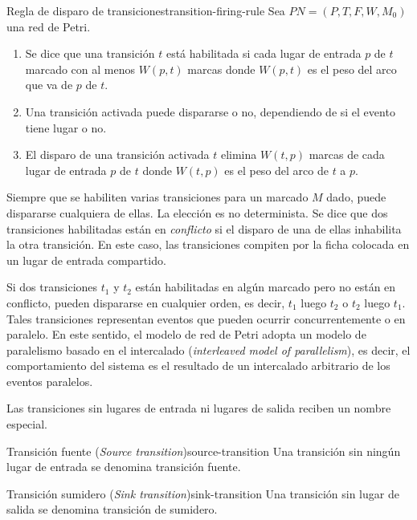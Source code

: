 \begin{definition}{Regla de disparo de transiciones}{transition-firing-rule}
      Sea $ PN = (P, T, F, W, M_{0}) $ una red de Petri.
      \begin{enumerate}[label=(\roman*)]
            \item Se dice que una transición $t$ está habilitada si cada lugar de entrada $p$ de $t$
                  marcado con al menos $W(p, t)$ marcas
                  donde $W(p,t)$ es el peso del arco que va de $p$ de $t$.
            \item Una transición activada puede dispararse o no, dependiendo de si el evento tiene
                  lugar o no.
            \item El disparo de una transición activada $t$ elimina
                  $W(t,p)$ marcas de cada lugar de entrada $p$ de $t$
                  donde $W(t, p)$ es el peso del arco de $t$ a $p$.
      \end{enumerate}
\end{definition}

Siempre que se habiliten varias transiciones para un marcado $M$ dado, puede dispararse
cualquiera de ellas. La elección es no determinista. Se dice que dos transiciones habilitadas
están en \emph{conflicto} si el disparo de una de ellas inhabilita la otra transición.
En este caso, las transiciones compiten por la ficha colocada en un lugar de entrada compartido.

Si dos transiciones $t_1$ y $t_2$ están habilitadas en algún marcado pero no están en conflicto, pueden
dispararse en cualquier orden, es decir, $t_1$ luego $t_2$ o $t_2$ luego $t_1$.
Tales transiciones representan eventos que pueden ocurrir concurrentemente o en paralelo.
En este sentido, el modelo de red de Petri adopta un modelo de paralelismo basado en el intercalado (\emph{interleaved model of parallelism}),
es decir, el comportamiento del sistema es el resultado de un intercalado arbitrario de los eventos paralelos.

Las transiciones sin lugares de entrada ni lugares de salida reciben un nombre especial.

\begin{definition}{Transición fuente (\textit{Source transition})}{source-transition}
      Una transición sin ningún lugar de entrada se denomina transición fuente.
\end{definition}

\begin{definition}{Transición sumidero (\textit{Sink transition})}{sink-transition}
      Una transición sin lugar de salida se denomina transición de sumidero.
\end{definition}

